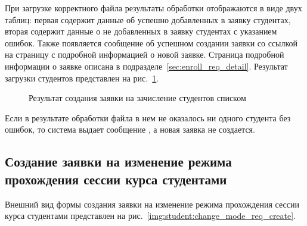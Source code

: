 При загрузке корректного файла результаты обработки отображаются в виде двух таблиц: 
первая содержит данные об успешно добавленных в заявку студентах, 
вторая содержит данные о не добавленных  в заявку студентах с указанием ошибок. 
Также появляется сообщение об успешном создании заявки со ссылкой на страницу с подробной информацией о новой заявке.
Страница подробной информации о заявке описана в подразделе~\ref{sec:enroll_req_detail}.
Результат загрузки студентов представлен на рис.~\ref{img:student:mass_enroll_req_create_result}.

\begin{figure}[H]
	\caption{Результат создания заявки на зачисление студентов списком }
	\label{img:student:mass_enroll_req_create_result}
\end{figure}

Если в результате обработки файла в нем не оказалось ни одного студента без ошибок, то 
система выдает сообщение , а новая заявка не создается.

\subsection{Создание заявки на изменение режима прохождения сессии курса студентами}

Внешний вид формы создания заявки на изменение режима прохождения сессии курса студентами
представлен на рис.~\ref{img:student:change_mode_req_create}.

